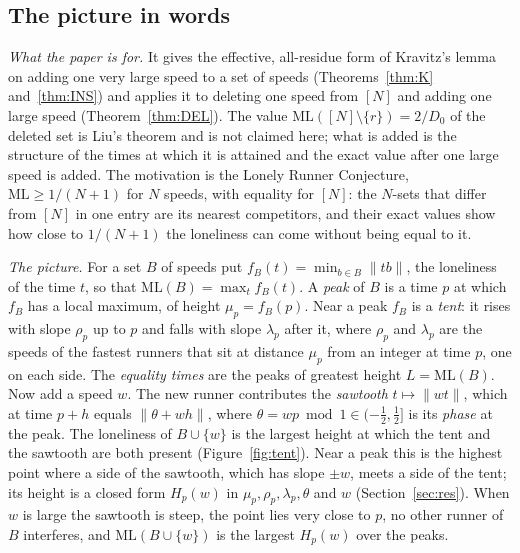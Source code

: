 \documentclass[11pt]{article}
\theoremstyle{definition}
\theoremstyle{remark}
\newcommand{\nd}[1]{\lVert #1\rVert}
\newcommand{\ML}{\mathrm{ML}}
\begin{document}
\subsection{The picture in words}\label{sec:words}
\emph{What the paper is for.} It gives the effective, all-residue form of Kravitz's lemma on adding one very large speed to a set of speeds (Theorems~\ref{thm:K} and~\ref{thm:INS}) and applies it to deleting one speed from $[N]$ and adding one large speed (Theorem~\ref{thm:DEL}). The value $\ML([N]\setminus\{r\})=2/D_0$ of the deleted set is Liu's theorem and is not claimed here; what is added is the structure of the times at which it is attained and the exact value after one large speed is added. The motivation is the Lonely Runner Conjecture, $\ML\ge1/(N+1)$ for $N$ speeds, with equality for $[N]$: the $N$-sets that differ from $[N]$ in one entry are its nearest competitors, and their exact values show how close to $1/(N+1)$ the loneliness can come without being equal to it.

\emph{The picture.} For a set $B$ of speeds put $f_B(t)=\min_{b\in B}\nd{tb}$, the loneliness of the time $t$, so that $\ML(B)=\max_tf_B(t)$. A \emph{peak} of $B$ is a time $p$ at which $f_B$ has a local maximum, of height $\mu_p=f_B(p)$. Near a peak $f_B$ is a \emph{tent}: it rises with slope $\rho_p$ up to $p$ and falls with slope $\lambda_p$ after it, where $\rho_p$ and $\lambda_p$ are the speeds of the fastest runners that sit at distance $\mu_p$ from an integer at time $p$, one on each side. The \emph{equality times} are the peaks of greatest height $L=\ML(B)$. Now add a speed $w$. The new runner contributes the \emph{sawtooth} $t\mapsto\nd{wt}$, which at time $p+h$ equals $\nd{\theta+wh}$, where $\theta=wp\bmod1\in(-\frac12,\frac12]$ is its \emph{phase} at the peak. The loneliness of $B\cup\{w\}$ is the largest height at which the tent and the sawtooth are both present (Figure~\ref{fig:tent}). Near a peak this is the highest point where a side of the sawtooth, which has slope $\pm w$, meets a side of the tent; its height is a closed form $H_p(w)$ in $\mu_p,\rho_p,\lambda_p,\theta$ and $w$ (Section~\ref{sec:res}). When $w$ is large the sawtooth is steep, the point lies very close to $p$, no other runner of $B$ interferes, and $\ML(B\cup\{w\})$ is the largest $H_p(w)$ over the peaks.
\end{document}
